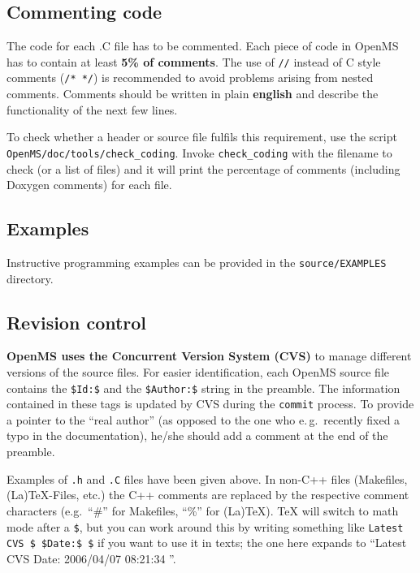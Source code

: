 \documentclass[a4]{article}
\begin{document}
\subsection{Commenting code}

The code for each .C file has to be commented. Each piece of code in OpenMS
has to contain at least {\bf 5\% of comments}. The use of {\tt //} instead of
C style comments ({\tt /* */}) is recommended to avoid problems arising from
nested comments. Comments should be written in plain \textbf{english} and
describe the functionality of the next few lines.

To check whether a header or source file fulfils this requirement, use the
script {\tt OpenMS/doc/tools/check\_coding}. Invoke {\tt check\_coding} with the
filename to check (or a list of files) and it will print the percentage of
comments (including Doxygen comments) for each file.


\subsection{Examples}

Instructive programming examples can be provided in the
\texttt{source/EXAMPLES} directory.


\subsection{Revision control}

\textbf{OpenMS uses the Concurrent Version System (CVS)} to manage different
versions of the source files. For easier identification, each OpenMS source
file contains the \texttt{\$Id{}:\$} and the \texttt{\$Author{}:\$} string in the
preamble.  The information contained in these tags is updated by CVS during
the \texttt{commit} process.  To provide a pointer to the ``real author'' (as
opposed to the one who e.\,g.\ recently fixed a typo in the documentation),
he/she should add a comment at the end of the preamble.

Examples of \texttt{.h} and \texttt{.C} files have been given above.  In
non-C++ files (Makefiles, (La)TeX-Files, etc.) the C++ comments are replaced
by the respective comment characters (e.g.\ ``\#'' for Makefiles, ``\%'' for
(La)TeX).  TeX will switch to math mode after a \texttt{\$}, but you can work
around this by writing something like
\mbox{\texttt{Latest CVS \$ \$Date{}:\$ \$}}
if you want to use it in texts; the one here expands to ``Latest CVS $
$Date: 2006/04/07 08:21:34 $ $''.
\end{document}
